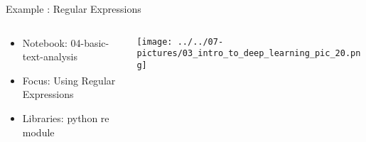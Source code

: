 \documentclass[11pt]{beamer}
\begin{document}
\begin{frame}{Example : Regular Expressions}
\begin{columns}[T] %
\begin{column}{.48\textwidth}
        \begin{itemize}
		\item Notebook: 04-basic-text-analysis
		\item Focus: Using Regular Expressions
		\item Libraries: python re module
        \end{itemize}
\end{column}%
\hfill%
\begin{column}{.48\textwidth}
        \texttt{[image: ../../07-pictures/03\_intro\_to\_deep\_learning\_pic\_20.png]}
\end{column}%
\end{columns}
\end{frame}
\end{document}

